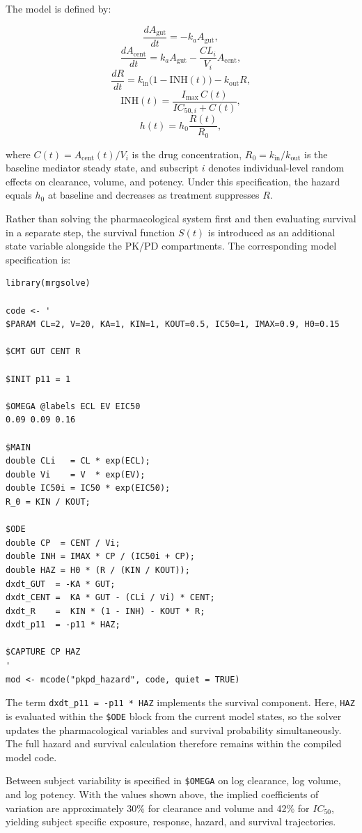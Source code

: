 The model is defined by:

\[\frac{dA_\mathrm{gut}}{dt} = -k_a A_\mathrm{gut},\]
\[\frac{dA_\mathrm{cent}}{dt} = k_a A_\mathrm{gut} - \frac{CL_i}{V_i} A_\mathrm{cent},\]
\[\frac{dR}{dt} = k_\mathrm{in}\bigl(1 - \mathrm{INH}(t)\bigr) - k_\mathrm{out} R,\]
\[\mathrm{INH}(t) = \frac{I_\mathrm{max}\, C(t)}{IC_{50,i} + C(t)},\]
\[h(t) = h_0 \frac{R(t)}{R_0},\]

where \(C(t) = A_\mathrm{cent}(t) / V_i\) is the drug concentration,
\(R_0 = k_\mathrm{in} / k_\mathrm{out}\) is the baseline mediator
steady state, and subscript \(i\) denotes individual-level random
effects on clearance, volume, and potency. Under this specification, the hazard equals \(h_0\) at baseline and decreases as treatment suppresses \(R\).

Rather than solving the pharmacological system first and then evaluating survival in a separate step, the survival function \(S(t)\) is introduced as an additional state variable alongside the PK/PD compartments. The corresponding  model specification is:

\begin{verbatim}
library(mrgsolve)

code <- '
$PARAM CL=2, V=20, KA=1, KIN=1, KOUT=0.5, IC50=1, IMAX=0.9, H0=0.15

$CMT GUT CENT R

$INIT p11 = 1

$OMEGA @labels ECL EV EIC50
0.09 0.09 0.16

$MAIN
double CLi   = CL * exp(ECL);
double Vi    = V  * exp(EV);
double IC50i = IC50 * exp(EIC50);
R_0 = KIN / KOUT;

$ODE
double CP  = CENT / Vi;
double INH = IMAX * CP / (IC50i + CP);
double HAZ = H0 * (R / (KIN / KOUT));
dxdt_GUT  = -KA * GUT;
dxdt_CENT =  KA * GUT - (CLi / Vi) * CENT;
dxdt_R    =  KIN * (1 - INH) - KOUT * R;
dxdt_p11  = -p11 * HAZ;

$CAPTURE CP HAZ
'
mod <- mcode("pkpd_hazard", code, quiet = TRUE)
\end{verbatim}

The term \texttt{dxdt\_p11\ =\ -p11\ *\ HAZ} implements the survival component. Here, \texttt{HAZ} is evaluated within the \texttt{\$ODE} block from the current model states, so the solver updates the pharmacological variables and survival probability simultaneously. The full hazard and survival calculation therefore remains within the compiled model code.

Between subject variability is specified in \texttt{\$OMEGA} on log clearance, log volume, and log potency. With the values shown above, the implied coefficients of variation are approximately 30\% for clearance and volume and 42\% for \(IC_{50}\), yielding subject specific exposure, response, hazard, and survival trajectories.

